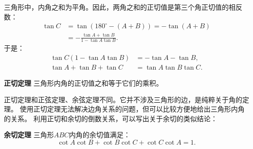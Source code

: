 \documentclass[12pt,UTF8,fontset=none]{ctexbook}
\begin{document}
三角形中，内角之和为平角。因此，两角之和的正切值是第三个角正切值的相反数：
\begin{align*}
    \tan C &= \tan (180^\circ - (A + B)) = - \tan (A + B)  \\
    &= - \frac{\tan A + \tan B}{1 - \tan A \tan B}.  
\end{align*}
于是：
\begin{align*}
    \tan C (1 - \tan A \tan B) &= - \tan A - \tan B,  \\
    \tan A + \tan B + \tan C &= \tan A \tan B \tan C. 
\end{align*}
\begin{tm}{\textbf{正切定理}}\label{tm:2-5-10}
    三角形内角的正切值之和等于它们的乘积。
\end{tm}
正切定理和正弦定理、余弦定理不同。它并不涉及三角形的边，是纯粹关于角的定理。
使用正切定理无法解决边角关系的问题，但可以比较方便地给出三角形内角的关系。
利用正切和余切的倒数关系，可以写出关于余切的类似结论：
\begin{tm}{\textbf{余切定理}}\label{tm:2-5-20}
    三角形$ABC$内角的余切值满足：
    $$ \cot A \cot B + \cot B \cot C + \cot C \cot A = 1.$$
\end{tm}
\end{document}
